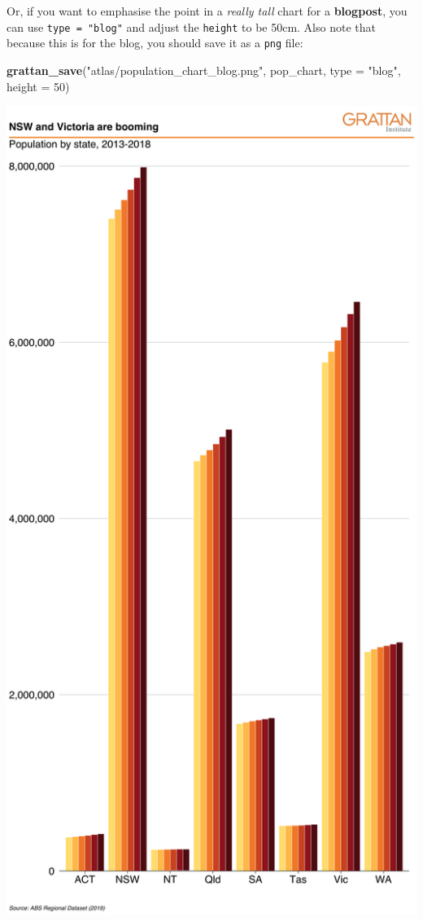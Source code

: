 \documentclass[]{book}
\newenvironment{Shaded}{\begin{snugshade}}{\end{snugshade}}
\newcommand{\DataTypeTok}[1]{\textcolor[rgb]{0.13,0.29,0.53}{#1}}
\newcommand{\DecValTok}[1]{\textcolor[rgb]{0.00,0.00,0.81}{#1}}
\newcommand{\KeywordTok}[1]{\textcolor[rgb]{0.13,0.29,0.53}{\textbf{#1}}}
\newcommand{\NormalTok}[1]{#1}
\newcommand{\StringTok}[1]{\textcolor[rgb]{0.31,0.60,0.02}{#1}}
\begin{document}
Or, if you want to emphasise the point in a \emph{really tall} chart for a \textbf{blogpost}, you can use \texttt{type\ =\ "blog"} and adjust the \texttt{height} to be 50cm. Also note that because this is for the blog, you should save it as a \texttt{png} file:

\begin{Shaded}
\begin{Highlighting}[]
\KeywordTok{grattan_save}\NormalTok{(}\StringTok{"atlas/population_chart_blog.png"}\NormalTok{, pop_chart, }
             \DataTypeTok{type =} \StringTok{"blog"}\NormalTok{, }\DataTypeTok{height =} \DecValTok{50}\NormalTok{)}
\end{Highlighting}
\end{Shaded}

\includegraphics[width=44.44in]{atlas/population_chart_blog}
\end{document}
